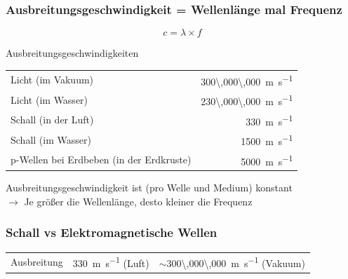\documentclass{beamer}
\begin{document}
\begin{frame}
  \frametitle{Ausbreitungsgeschwindigkeit = Wellenlänge mal Frequenz}

\[
c = \lambda \times f
\]

\begin{block}{Ausbreitungsgeschwindigkeiten}

\begin{tabular}{lr}
Licht (im Vakuum)       & \SI{300\,000\,000}{\meter\per\second} \\
Licht (im Wasser)       & \SI{230\,000\,000}{\meter\per\second} \\
Schall (in der Luft)    & \SI{330}{\meter\per\second} \\
Schall (im Wasser)      & \SI{1500}{\meter\per\second} \\
p-Wellen bei Erdbeben (in der Erdkruste)     & \SI{5000}{\meter\per\second} \\
\end{tabular}

\end{block}

\pause

Ausbreitungsgeschwindigkeit ist (pro Welle und Medium) konstant \\
\(\rightarrow\)  Je größer die Wellenlänge, desto kleiner die Frequenz \\

\end{frame}

\begin{frame}
\frametitle{Schall vs Elektromagnetische Wellen}

\begin{tabular}{|l|l|l|}
\hline
        & \color{theme}{\textbf{Schallwellen}}  & \color{theme}{\textbf{Elektromagnetische Wellen}}     \\
\hline
Ausbreitung       & \SI{330}{\meter\per\second} (Luft)  &  \(\sim\)\SI{300\,000\,000}{\meter\per\second} (Vakuum)   \\
\hline
\end{tabular}
\end{frame}
\end{document}
